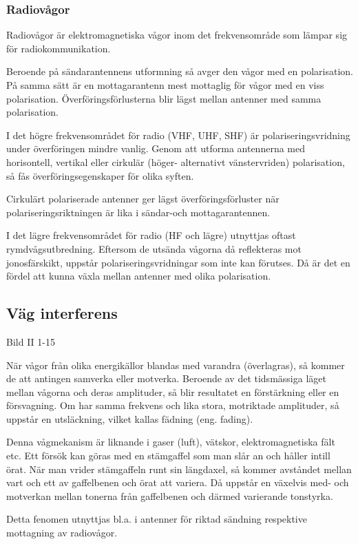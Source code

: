 \documentclass[a4paper,twoside,twocolumn,openright]{book}
\begin{document}
\subsubsection{Radiovågor}
Radiovågor är elektromagnetiska vågor inom
det frekvensområde som lämpar sig för radiokommunikation.

Beroende på sändarantennens utformning så avger den vågor med en polarisation. På samma
sätt är en mottagarantenn mest mottaglig för vågor med en viss polarisation.
Överföringsförlusterna blir lägst mellan antenner med samma polarisation.

I det högre frekvensområdet för radio (VHF, UHF, SHF) är polariseringsvridning under
överföringen mindre vanlig. Genom att utforma antennerna med horisontell, vertikal eller
cirkulär (höger- alternativt vänstervriden) polarisation, så fås överföringsegenskaper för
olika syften.

Cirkulärt polariserade antenner ger lägst överföringsförluster när polariseringsriktningen
är lika i sändar-och mottagarantennen.

I det lägre frekvensområdet för radio (HF och lägre) utnyttjas oftast rymdvågsutbredning.
Eftersom de utsända vågorna då reflekteras mot jonosfärskikt, uppstår
polariseringsvridningar som inte kan förutses. Då är det en fördel att kunna växla mellan
antenner med olika polarisation.

\subsection{Väg interferens}

Bild II 1-15

När vågor från olika energikällor blandas med varandra (överlagras), så kommer de att
antingen samverka eller motverka. Beroende av det tidsmässiga läget mellan vågorna och
deras amplituder, så blir resultatet en förstärkning eller en försvagning. Om har samma
frekvens och lika stora, motriktade amplituder, så uppstår en utsläckning, vilket kallas
fädning (eng. fading).

Denna vågmekanism är liknande i gaser (luft), vätskor, elektromagnetiska fält etc. Ett
försök kan göras med en stämgaffel som man slår an och håller intill örat. När man
vrider stämgaffeln runt sin längdaxel, så kommer avståndet mellan vart och ett av
gaffelbenen och örat att variera. Då uppstår en växelvis med- och motverkan mellan tonerna
från gaffelbenen och därmed varierande tonstyrka.

Detta fenomen utnyttjas bl.a. i antenner för riktad sändning respektive mottagning av
radiovågor.
\end{document}
